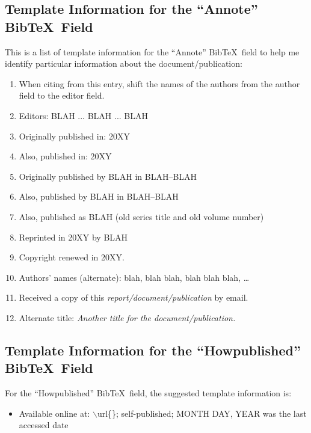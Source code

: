 \documentclass[letter,12pt]{article}
\begin{document}
\subsection{Template Information for the ``Annote'' {\sc Bib}\TeX\ Field}
\label{ssec:TemplateInformationForTheAnnoteBibTeXField}

This is a list of template information for the ``Annote'' {\sc Bib}\TeX\ field to help me identify particular information about the document/publication: \vspace{-0.3cm}
\begin{enumerate} \itemsep -4pt
\item When citing from this entry, shift the names of the authors from the author field to the editor field.
\item Editors: BLAH ... BLAH ... BLAH
\item Originally published in: 20XY
\item Also, published in: 20XY
\item Originally published by BLAH in BLAH--BLAH
\item Also, published by BLAH in BLAH--BLAH
\item Also, published as BLAH (old series title and old volume number)
\item Reprinted in 20XY by BLAH
\item Copyright renewed in 20XY.
\item Authors' names (alternate): blah, blah blah, blah blah blah, \dots
\item Received a copy of this {\it report/document/publication} by email.
\item Alternate title: {\it Another title for the document/publication.}
\end{enumerate}



\subsection{Template Information for the ``Howpublished'' {\sc Bib}\TeX\ Field}
\label{ssec:TemplateInformationForTheHowpublishedBibTeXField}

For the ``Howpublished'' {\sc Bib}\TeX\ field, the suggested template information is: \vspace{-0.3cm}
\begin{itemize} \itemsep -4pt
\item Available online at: $\backslash$url\{\}; self-published; MONTH DAY, YEAR was the last accessed date
\end{itemize}
\end{document}
